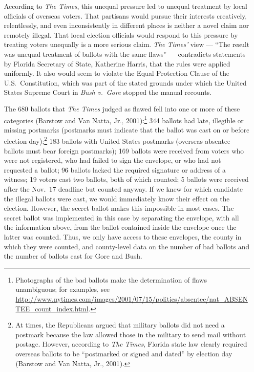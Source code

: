 \documentclass[11pt,titlepage]{article}
\begin{document}
According to \emph{The Times}, this unequal pressure led to unequal
treatment by local officials of overseas voters.  That partisans would
pursue their interests creatively, relentlessly, and even
inconsistently in different places is neither a novel claim nor
remotely illegal.  That local election officials would respond to this
pressure by treating voters unequally is a more serious claim.
\emph{The Times'} view --- ``The result was unequal treatment of
ballots with the same flaws'' --- contradicts statements by Florida
Secretary of State, Katherine Harris, that the rules were applied
uniformly.  It also would seem to violate the Equal Protection Clause
of the U.S.\ Constitution, which was part of the stated grounds under
which the United States Supreme Court in \emph{Bush v.\ Gore} stopped
the manual recounts.

The 680 ballots that \emph{The Times} judged as flawed fell into one
or more of these categories (Barstow and Van Natta, Jr.,
2001):\footnote{Photographs of the bad ballots make the determination
  of flaws unambiguous; for examples, see
  \url{http://www.nytimes.com/images/2001/07/15/politics/absentee/nat_ABSENTEE_count_index.html}.}
344 ballots had late, illegible or missing postmarks (postmarks must
indicate that the ballot was cast on or before election
day);\footnote{At times, the Republicans argued that military ballots
  did not need a postmark because the law allowed those in the
  military to send mail without postage.  However, according to
  \emph{The Times}, Florida state law clearly required overseas
  ballots to be ``postmarked or signed and dated'' by election day
  (Barstow and Van Natta, Jr., 2001).}  183 ballots with United States
postmarks (overseas absentee ballots must bear foreign postmarks); 169
ballots were received from voters who were not registered, who had
failed to sign the envelope, or who had not requested a ballot; 96
ballots lacked the required signature or address of a witness; 19
voters cast two ballots, both of which counted; 5 ballots were
received after the Nov.\ 17 deadline but counted anyway.  If we knew
for which candidate the illegal ballots were cast, we would
immediately know their effect on the election. However, the secret
ballot makes this impossible in most cases.  The secret ballot was
implemented in this case by separating the envelope, with all the
information above, from the ballot contained inside the envelope once
the latter was counted.  Thus, we only have access to these envelopes,
the county in which they were counted, and county-level data on the
number of bad ballots and the number of ballots cast for Gore and
Bush.
\end{document}

